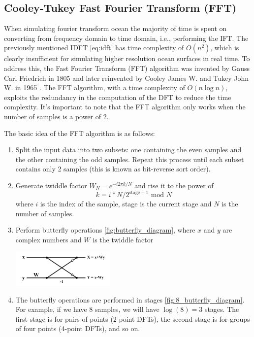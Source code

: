 \subsection{Cooley-Tukey Fast Fourier Transform (FFT)}
When simulating fourier transform ocean the majority of time is spent on converting from frequency domain to time domain, i.e., performing the IFT.
The previously mentioned IDFT \ref{eq:idft} has time complexity of $O(n^2)$, which is clearly insufficient for simulating higher resolution ocean surfaces in real time.
To address this, the Fast Fourier Transform (FFT) algorithm was invented by Gauss Carl Friedrich in 1805 \cite{gauss1866} and later reinvented by Cooley James W. and Tukey John W. in 1965 \cite{cooley1965}. 
The FFT algorithm, with a time complexity of $O(n\log n)$, exploits the redundancy in the computation of the DFT to reduce the time complexity. It's important to note that the FFT algorithm only works when the number of samples is a power of 2.

The basic idea of the FFT algorithm is as follows:
\begin{enumerate}
    \item Split the input data into two subsets: one containing the even samples and the other containing the odd samples. Repeat this process until each subset contains only 2 samples (this is known as bit-reverse sort order).
    \item Generate twiddle factor $W_N = e^{-i 2 \pi k / N}$ and rise it to the power of \\
    \begin{equation}
        k = i * N / 2^{\text{stage} + 1} \text{ mod } N
    \end{equation}
    where $i$ is the index of the sample, stage is the current stage and $N$ is the number of samples.
    \item Perform butterfly operations \ref{fig:butterfly_diagram}, where $x$ and $y$ are complex numbers and $W$ is the twiddle factor

    \begin{minipage}{1\textwidth}
        \centering
        \includegraphics[width=0.4\textwidth]{"images/butterfly_diagram.png"}
        \label{fig:butterfly_diagram}
    \end{minipage}

    \item The butterfly operations are performed in stages \ref{fig:8_butterfly_diagram}. For example, if we have 8 samples, we will have $\log(8) = 3 $ stages. The first stage is for pairs of points (2-point DFTs), the second stage is for groups of four points (4-point DFTs), and so on.
\end{enumerate}

